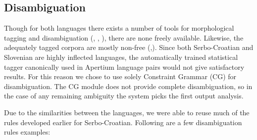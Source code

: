 
\subsection{Disambiguation}
Though for both languages there exists a number of tools for
morphological tagging and disambiguation (\citealp{vitas2004intex}, \citealp{agic2008improving}, \citealp{snajder08automatic}), there
are none freely available. Likewise, the adequately tagged corpora are
mostly non-free (\citealp{erjavec2004multext},\citealp{tadic2002building}).  Since both Serbo-Croatian and Slovenian are
highly inflected languages, the automatically trained statistical
tagger canonically used in Apertium language pairs would not give
satisfactory results. For this reason we chose to use solely
Constraint Grammar (CG) for disambiguation. The CG module does not
provide complete disambiguation, so in the case of any remaining
ambiguity the system picks the first output analysis.

Due to the similarities between the languages, we were able to
reuse much of the rules developed earlier for Serbo-Croatian. Following are
a few disambiguation rules examples:

